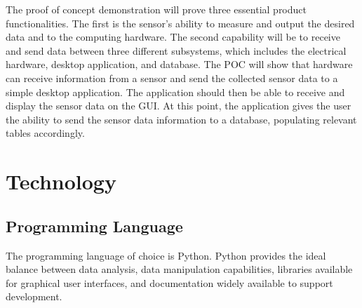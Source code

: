 \documentclass[12pt,titlepage]{article}
\begin{document}
The proof of concept demonstration will prove three essential product
functionalities. The first is the sensor's ability to measure and output the  
desired data and to the computing hardware. The second capability will be to receive and send 
data between three different subsystems, which includes the electrical hardware, desktop application, and database. 
The POC will show that hardware can receive information from a sensor and send the collected sensor data 
to a simple desktop application. The application should then be able to receive and display the sensor 
data on the GUI. At this point, the application gives the user the ability to send the sensor data
information to a database, populating relevant tables accordingly. 

\section{Technology}

\subsection{Programming Language}

The programming language of choice is Python. Python provides the ideal balance between data analysis, data manipulation capabilities, libraries available for graphical user interfaces, and documentation widely available to support development.  
\end{document}
